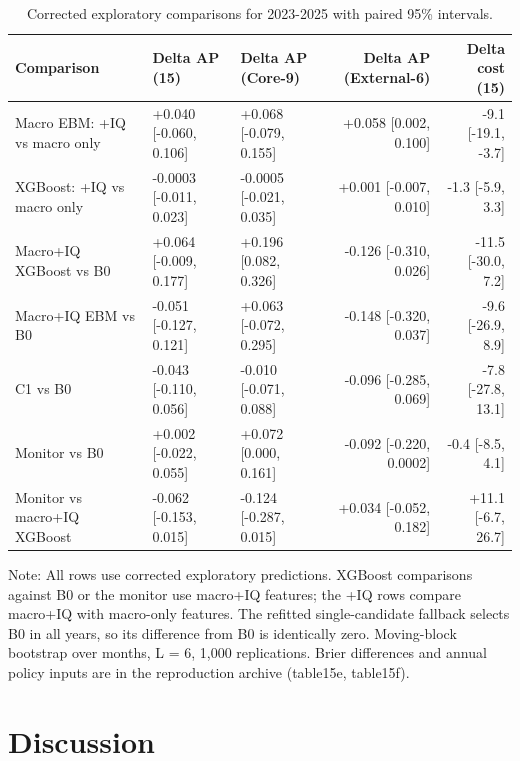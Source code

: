 \documentclass[preprint,12pt,authoryear]{elsarticle}
\begin{document}
\begin{table}[!htbp]
\centering
\scriptsize
\setlength{\tabcolsep}{3pt}
\caption{Corrected exploratory comparisons for 2023-2025 with paired 95\% intervals.}
\label{tab:extdiff}
\begin{tabular}{lllrr}
\toprule
Comparison & Delta AP (15) & Delta AP (Core-9) & Delta AP (External-6) & Delta cost (15) \\
\midrule
Macro EBM: +IQ vs macro only & +0.040 [-0.060, 0.106] & +0.068 [-0.079, 0.155] & +0.058 [0.002, 0.100] & -9.1 [-19.1, -3.7] \\
XGBoost: +IQ vs macro only & -0.0003 [-0.011, 0.023] & -0.0005 [-0.021, 0.035] & +0.001 [-0.007, 0.010] & -1.3 [-5.9, 3.3] \\
Macro+IQ XGBoost vs B0 & +0.064 [-0.009, 0.177] & +0.196 [0.082, 0.326] & -0.126 [-0.310, 0.026] & -11.5 [-30.0, 7.2] \\
Macro+IQ EBM vs B0 & -0.051 [-0.127, 0.121] & +0.063 [-0.072, 0.295] & -0.148 [-0.320, 0.037] & -9.6 [-26.9, 8.9] \\
C1 vs B0 & -0.043 [-0.110, 0.056] & -0.010 [-0.071, 0.088] & -0.096 [-0.285, 0.069] & -7.8 [-27.8, 13.1] \\
Monitor vs B0 & +0.002 [-0.022, 0.055] & +0.072 [0.000, 0.161] & -0.092 [-0.220, 0.0002] & -0.4 [-8.5, 4.1] \\
Monitor vs macro+IQ XGBoost & -0.062 [-0.153, 0.015] & -0.124 [-0.287, 0.015] & +0.034 [-0.052, 0.182] & +11.1 [-6.7, 26.7] \\
\bottomrule
\end{tabular}
\par\vspace{2pt}\parbox{0.95\linewidth}{\scriptsize Note: All rows use corrected exploratory predictions. XGBoost comparisons against B0 or the monitor use macro+IQ features; the +IQ rows compare macro+IQ with macro-only features. The refitted single-candidate fallback selects B0 in all years, so its difference from B0 is identically zero. Moving-block bootstrap over months, L = 6, 1,000 replications. Brier differences and annual policy inputs are in the reproduction archive (table15e, table15f).}
\end{table}
\section{Discussion}
\end{document}
